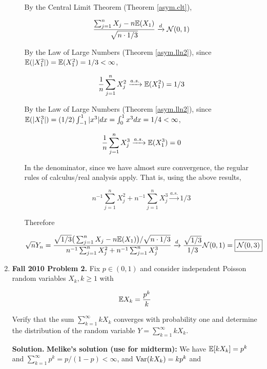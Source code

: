 \begin{enumerate}[(1)]
\begin{enumerate}[(a)]
By the Central Limit Theorem (Theorem \ref{asym.clt}),
 
\[
 \frac{\sum_{j=1}^n X_j - n\mathbb{E}(X_1) }{\sqrt{n \cdot1/3} } \xrightarrow{d} \mathcal{N}(0, 1)
\]

By the Law of Large Numbers (Theorem \ref{asym.lln2}), since \(\mathbb{E}(|X_1^2|) = \mathbb{E}(X_1^2) = 1/3 < \infty\),

\[
\frac{1}{n}\sum_{j=1}^n X_j^2 \xrightarrow{a.s.} \mathbb{E}(X_1^2) =   1/3
\]

By the Law of Large Numbers (Theorem \ref{asym.lln2}), since \(\mathbb{E}(|X_1^3|) = (1/2) \int_{-1}^1 |x^3| dx = \int_0^1 x^3 dx = 1/4 < \infty\),

\[
\frac{1}{n}\sum_{j=1}^n X_j^3 \xrightarrow{a.s.} \mathbb{E}(X_1^3) =   0
\]

In the denominator, since we have almost sure convergence, the regular rules of calculus/real analysis apply. That is, using the above results,

\[
n^{-1}\sum_{j=1}^n X_j^2 + n^{-1}\sum_{j=1}^n X_j^3 \xrightarrow{a.s.} 1/3
\]

Therefore

\[
\sqrt{n} Y_n =  \frac{\sqrt{1/3} \big(\sum_{j=1}^n X_j - n\mathbb{E}(X_1) \big)/ \sqrt{n \cdot1/3} }{n^{-1}\sum_{j=1}^n X_j^2 + n^{-1}\sum_{j=1}^n X_j^3} \xrightarrow{d} \frac{\sqrt{1/3} }{1/3} \mathcal{N}(0, 1) = \boxed{\mathcal{N}(0, 3)}
\]

\end{enumerate}

\item 


\textbf{Fall 2010 Problem 2.} Fix \(p \in (0, 1)\) and consider independent Poisson random variables \(X_k, k \geq 1\) with

\[
\mathbb{E} X_k = \frac{p^k}{k}
\]

Verify that the sum \(\sum_{k=1}^\infty k X_k\) converges with probability one and determine the distribution of the random variable \(Y = \sum_{k=1}^\infty k X_k\).

\textbf{Solution.} %
\textbf{Melike's solution (use for midterm):} We have \(\mathbb{E}[k X_k] = p^k\) and \(\sum_{k=1}^\infty p^k = p/(1-p) < \infty\), and \(\mathrm{Var}(k X_k) = kp^k\) and 


\end{enumerate}
